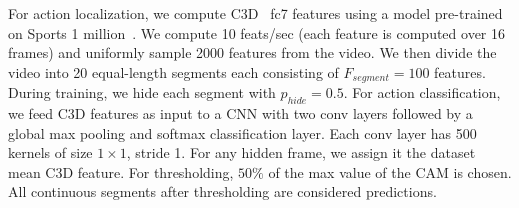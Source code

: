 \documentclass[10pt,twocolumn,letterpaper]{article}
\begin{document}
For action localization, we compute C3D~\cite{tran-iccv2015} fc7 features using a model pre-trained on Sports 1 million~\cite{karpathy-CVPR14}. We compute 10 feats/sec (each feature is computed over 16 frames) and uniformly sample 2000 features from the video. We then divide the video into 20 equal-length segments each consisting of $F_{segment} = 100$ features.  During training, we hide each segment with $p_{hide} = 0.5$.  For action classification, we feed C3D features as input to a CNN with two conv layers followed by a global max pooling and softmax classification layer. Each conv layer has 500 kernels of size $1 \times 1$, stride 1. For any hidden frame, we assign it the dataset mean C3D feature. For thresholding, $50\%$ of the max value of the CAM is chosen. All continuous segments after thresholding are considered predictions.
\end{document}
